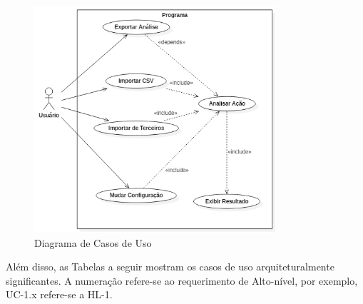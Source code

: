 \documentclass[12pt]{article}
\begin{document}
\begin{figure}[H]
	\centering
	\includegraphics[width=0.8\textwidth]{UseCaseDiagram.png}
	\caption{Diagrama de Casos de Uso}\label{fig:UseCaseDiagram}
\end{figure}

Além disso, as Tabelas a seguir mostram os casos de uso arquiteturalmente significantes.
A numeração refere-se ao requerimento de Alto-nível, por exemplo, UC-1.x refere-se a HL-1.
\end{document}
